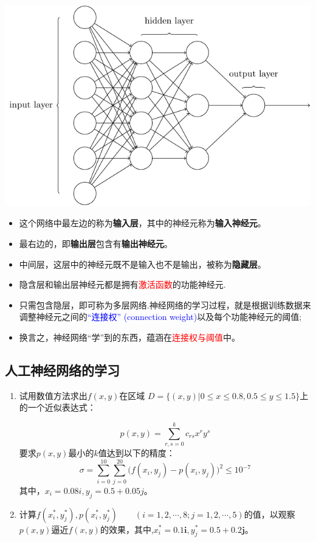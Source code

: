 \begin{center}
  \includegraphics{figure//tikz11}
\end{center}

\begin{itemize}
\item 这个网络中最左边的称为\textbf{输入层}，其中的神经元称为\textbf{输入神经元}。

\item 最右边的，即\textbf{输出层}包含有\textbf{输出神经元}。

\item 中间层，这层中的神经元既不是输入也不是输出，被称为\textbf{隐藏层}。 

\item 隐含层和输出层神经元都是拥有\textcolor{red}{激活函数}的功能神经元. 

\item 只需包含隐层，即可称为多层网络.神经网络的学习过程，就是根据训练数据来调整神经元之间的\textcolor{blue}{“连接权” (connection weight)}以及每个功能神经元的阈值;

\item 换言之，神经网络“学”到的东西，蕴涵在\textcolor{red}{连接权与阈值}中。

\end{itemize}
\subsection{人工神经网络的学习}

\begin{enumerate}
\item 试用数值方法求出$f(x, y)$在区域
$D = \{ (x,y)|0 \le x \le 0.8,0.5 \le y \le 1.5\}$上的一个近似表达式：

\[\boxed{p(x,y) = \sum\limits_{r,s = 0}^k {{c_{rs}}{x^r}{y^s}} }\]
要求$p(x,y)$最小的$k$值达到以下的精度：
\[\sigma  = \sum\limits_{i = 0}^{10} {\sum\limits_{j = 0}^{20} {(f({x_i},{y_j}) - p} } ({x_i},{y_j}){)^2} \le {10^{ - 7}}\]
其中，${x_i} = 0.08i,{y_j} = 0.5 + 0.05j$。

\item 计算$f(x_i^{\ast},y_j^{\ast}),p(x_i^{\ast},y_j^{\ast})\qquad (i = 1, 2,\cdots,8;j = 1,2,\cdots,5)$的值，以观察$p(x,y)$逼近$f(x,y)$的效果，其中,$x_i^{\ast}=0.1\bm{i},y_j^{\ast}=0.5+0.2\bm{j}$。
\end{enumerate}


